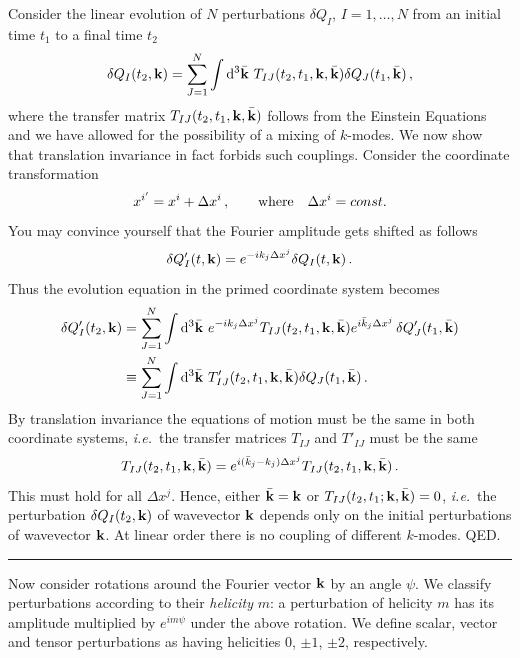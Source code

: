 \documentclass[12pt,letterpaper,rotate]{article}
\def\beq{\begin{equation}}
\def\eeq{\end{equation}}
\def\d{{\rm d}}
\begin{document}
{Consider the linear evolution of $N$ perturbations $\delta Q_I$, $I=1,\dots, N$ from an initial time $t_1$ to a final time $t_2$
\beq
\delta Q_I(t_2, {\bf k}) = \sum_{J=1}^N \int \d^3 \bar {\bf k} \ T_{IJ}(t_2,t_1, {\bf k}, \bar {\bf k}) \delta Q_J(t_1, \bar {\bf k})\, ,
\eeq
where the transfer matrix $T_{IJ}(t_2,t_1, {\bf k}, \bar {\bf k}) $ follows from the Einstein Equations and we have allowed for the possibility of a mixing of $k$-modes. We now show that translation invariance in fact forbids such couplings. Consider the coordinate transformation
\beq
x^{i'} = x^i + \Delta x^i\, , \qquad {\rm where} \quad \Delta x^i = const.
\eeq
You may convince yourself that the Fourier amplitude gets shifted as follows
\beq
\delta Q_I'(t, {\bf k} ) = e^{-i k_j \Delta x^j} \delta Q_I(t, {\bf k} ) \, .
\eeq
Thus the evolution equation in the primed coordinate system becomes
\begin{align}
\delta Q_I'(t_2, {\bf k}) &= \sum_{J=1}^N \int \d^3 \bar {\bf k} \ e^{-i k_j \Delta x^j} T_{IJ}(t_2,t_1, {\bf k}, \bar {\bf k}) e^{i \bar k_j \Delta x^j }\,\delta Q_J'(t_1, \bar {\bf k}) \\
&\equiv \sum_{J=1}^N \int \d^3 \bar {\bf k} \ T_{IJ}'(t_2,t_1, {\bf k}, \bar {\bf k}) \delta Q_J(t_1, \bar {\bf k})\, .
\end{align}
By translation invariance the equations of motion must be the same in both coordinate systems, {\it i.e.}~the transfer matrices $T_{IJ}$ and $T'_{IJ}$ must be the same
\beq
 T_{IJ}(t_2,t_1, {\bf k}, \bar {\bf k}) =  e^{i(\bar k_j - k_j) \Delta x^j} T_{IJ}(t_2,t_1, {\bf k}, \bar {\bf k}) \, .
\eeq
This must hold for all $\Delta x^j$. Hence, either $\bar {\bf k} = {\bf k}$ or  $T_{IJ}(t_2,t_1; {\bf k}, \bar {\bf k}) =0$, {\it i.e.}~the perturbation $\delta Q_I(t_2, {\bf k}) $ of wavevector ${\bf k}$ depends only on the initial perturbations of wavevector ${\bf k}$. At linear order there is no coupling of different $k$-modes. QED.
\vspace{0.2cm}  \hrule
 \vspace{0.5cm}
 
Now consider rotations around the Fourier vector ${\bf k}$ by an angle $\psi$.
We classify perturbations according to their {\it helicity} $m$:
a perturbation of helicity $m$ has its amplitude multiplied by $e^{im \psi}$ under the above rotation.
We define scalar, vector and tensor perturbations as having helicities 0, $\pm 1$, $\pm 2$, respectively.

}
\end{document}
